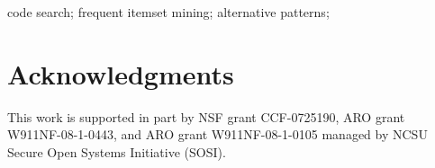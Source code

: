 \documentclass[10pt, conference, compsocconf]{IEEEtran}
\begin{document}


\begin{IEEEkeywords}
code search; frequent itemset mining; alternative patterns;
\end{IEEEkeywords}

















\section*{Acknowledgments}
This work is supported in part by NSF grant CCF-0725190, ARO grant W911NF-08-1-0443, and ARO grant W911NF-08-1-0105 managed by NCSU Secure Open Systems Initiative (SOSI).


\end{document}
